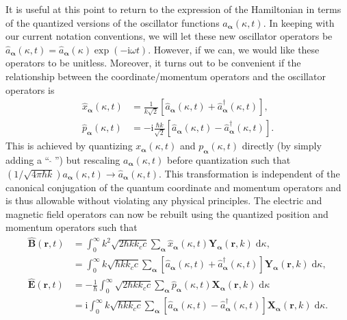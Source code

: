 \documentclass{article}
\numberwithin{equation}{section}
\begin{document}
It is useful at this point to return to the expression of the Hamiltonian in terms of the quantized versions of the oscillator functions $a_{\bm{\alpha}}(\kappa,t)$. In keeping with our current notation conventions, we will let these new oscillator operators be $\hat{a}_{\bm{\alpha}}(\kappa,t) = \hat{a}_{\bm{\alpha}}(\kappa)\exp(-\mathrm{i}\omega t)$. However, if we can, we would like these operators to be unitless. Moreover, it turns out to be convenient if the relationship between the coordinate/momentum operators and the oscillator operators is
\begin{equation}\label{eq:xAndP2}
\begin{split}
\hat{x}_{\bm{\alpha}}(\kappa,t) &= \frac{1}{k\sqrt{2}}\left[\hat{a}_{\bm{\alpha}}(\kappa,t) + \hat{a}_{\bm{\alpha}}^\dagger(\kappa,t)\right],\\
\hat{p}_{\bm{\alpha}}(\kappa,t) &= -\mathrm{i}\frac{\hbar k}{\sqrt{2}}\left[\hat{a}_{\bm{\alpha}}(\kappa,t) - \hat{a}_{\bm{\alpha}}^\dagger(\kappa,t)\right].
\end{split}
\end{equation}
This is achieved by quantizing $x_{\bm{\alpha}}(\kappa,t)$ and $p_{\bm{\alpha}}(\kappa,t)$ directly (by simply adding a ``$\;\hat{}\;$'') but rescaling $a_{\bm{\alpha}}(\kappa,t)$ before quantization such that $(1/\sqrt{4\pi\hbar k})a_{\bm{\alpha}}(\kappa,t)\to\hat{a}_{\bm{\alpha}}(\kappa,t)$. This transformation is independent of the canonical conjugation of the quantum coordinate and momentum operators and is thus allowable without violating any physical principles. The electric and magnetic field operators can now be rebuilt using the quantized position and momentum operators such that
\begin{equation}
\begin{split}
\hat{\mathbf{B}}(\mathbf{r},t) &= \int_0^\infty k^2\sqrt{2\hbar kk_cc}\sum_{\bm{\alpha}}\hat{x}_{\bm{\alpha}}(\kappa,t)\mathbf{Y}_{\bm{\alpha}}(\mathbf{r},k)\;\mathrm{d}\kappa,\\
&= \int_0^\infty k\sqrt{\hbar kk_cc}\sum_{\bm{\alpha}}\left[\hat{a}_{\bm{\alpha}}(\kappa,t) + \hat{a}_{\bm{\alpha}}^\dagger(\kappa,t)\right]\mathbf{Y}_{\bm{\alpha}}(\mathbf{r},k)\;\mathrm{d}\kappa,\\[0.5em]
\hat{\mathbf{E}}(\mathbf{r},t) &= -\frac{1}{\hbar}\int_0^\infty\sqrt{2\hbar kk_cc}\sum_{\bm{\alpha}}\hat{p}_{\bm{\alpha}}(\kappa,t)\mathbf{X}_{\bm{\alpha}}(\mathbf{r},k)\;\mathrm{d}\kappa\\
&= \mathrm{i}\int_0^\infty k\sqrt{\hbar kk_cc}\sum_{\bm{\alpha}}\left[\hat{a}_{\bm{\alpha}}(\kappa,t) - \hat{a}_{\bm{\alpha}}^\dagger(\kappa,t)\right]\mathbf{X}_{\bm{\alpha}}(\mathbf{r},k)\;\mathrm{d}\kappa.
\end{split}
\end{equation}
\end{document}

